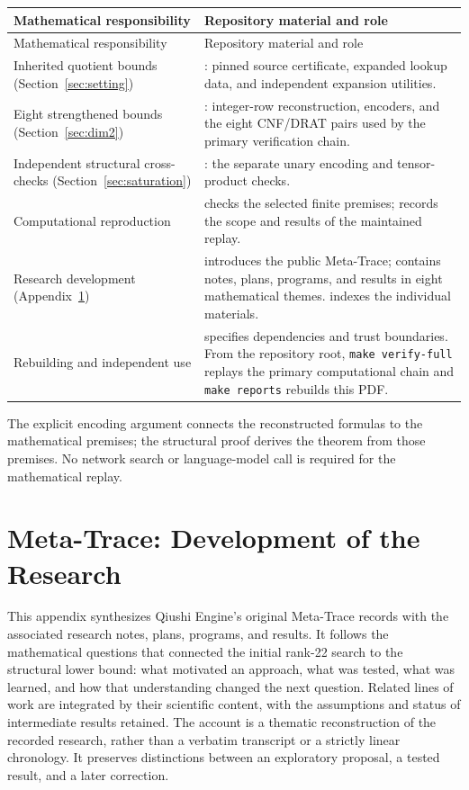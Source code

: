 \documentclass[11pt,a4paper]{article}
\begin{document}
\begin{longtable}{@{}L{4.8cm}L{9.8cm}@{}}
\toprule
Mathematical responsibility & Repository material and role\\
\midrule
\endfirsthead
\toprule Mathematical responsibility & Repository material and role\\\midrule
\endhead
\bottomrule\endfoot
Inherited quotient bounds (Section~\ref{sec:setting})
& : pinned source certificate, expanded
lookup data, and independent expansion utilities.\\
Eight strengthened bounds (Section~\ref{sec:dim2})
& : integer-row reconstruction, encoders,
and the eight CNF/DRAT pairs used by the primary verification chain.\\
Independent structural cross-checks (Section~\ref{sec:saturation})
& : the separate unary encoding and
tensor-product checks.\\
Computational reproduction
&  checks the selected finite
premises;  records the scope and results
of the maintained replay.\\
Research development (Appendix~\ref{app:research-record})
&  introduces the public Meta-Trace;
 contains notes, plans, programs, and results
in eight mathematical themes.  indexes
the individual materials.\\
Rebuilding and independent use
&  specifies dependencies and trust
boundaries. From the repository root, \texttt{make verify-full} replays the
primary computational chain and \texttt{make reports} rebuilds this PDF.\\
\end{longtable}

The explicit encoding argument connects the reconstructed formulas to
the mathematical premises; the structural proof derives the theorem
from those premises. No network search or language-model call is required
for the mathematical replay.

\FloatBarrier
\clearpage
\section{Meta-Trace: Development of the Research}\label{app:research-record}

This appendix synthesizes Qiushi Engine's original Meta-Trace records
with the associated research notes, plans, programs, and results. It
follows the mathematical questions that connected the
initial rank-22 search to the structural lower bound: what motivated an
approach, what was tested, what was learned, and how that understanding
changed the next question. Related lines of work are integrated by their
scientific content, with the assumptions and status of intermediate
results retained. The account is a thematic reconstruction of the recorded
research, rather than a verbatim transcript or a strictly linear chronology.
It preserves distinctions between an exploratory proposal, a tested result,
and a later correction.
\end{document}

